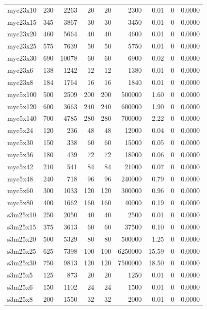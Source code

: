 {\begin{longtable}{lrrrrrrrr}
myc23x10 & 230 & 2263 & 20 & 20 & 2300 & 0.01 & 0 & 0.0000 \\
myc23x15 & 345 & 3867 & 30 & 30 & 3450 & 0.01 & 0 & 0.0000 \\
myc23x20 & 460 & 5664 & 40 & 40 & 4600 & 0.01 & 0 & 0.0000 \\
myc23x25 & 575 & 7639 & 50 & 50 & 5750 & 0.01 & 0 & 0.0000 \\
myc23x30 & 690 & 10078 & 60 & 60 & 6900 & 0.02 & 0 & 0.0000 \\
myc23x6 & 138 & 1242 & 12 & 12 & 1380 & 0.01 & 0 & 0.0000 \\
myc23x8 & 184 & 1764 & 16 & 16 & 1840 & 0.01 & 0 & 0.0000 \\
myc5x100 & 500 & 2509 & 200 & 200 & 500000 & 1.60 & 0 & 0.0000 \\
myc5x120 & 600 & 3663 & 240 & 240 & 600000 & 1.90 & 0 & 0.0000 \\
myc5x140 & 700 & 4785 & 280 & 280 & 700000 & 2.22 & 0 & 0.0000 \\
myc5x24 & 120 & 236 & 48 & 48 & 12000 & 0.04 & 0 & 0.0000 \\
myc5x30 & 150 & 338 & 60 & 60 & 15000 & 0.05 & 0 & 0.0000 \\
myc5x36 & 180 & 439 & 72 & 72 & 18000 & 0.06 & 0 & 0.0000 \\
myc5x42 & 210 & 541 & 84 & 84 & 21000 & 0.07 & 0 & 0.0000 \\
myc5x48 & 240 & 718 & 96 & 96 & 240000 & 0.79 & 0 & 0.0000 \\
myc5x60 & 300 & 1033 & 120 & 120 & 300000 & 0.96 & 0 & 0.0000 \\
myc5x80 & 400 & 1662 & 160 & 160 & 40000 & 0.19 & 0 & 0.0000 \\
s3m25x10 & 250 & 2050 & 40 & 40 & 2500 & 0.01 & 0 & 0.0000 \\
s3m25x15 & 375 & 3613 & 60 & 60 & 37500 & 0.10 & 0 & 0.0000 \\
s3m25x20 & 500 & 5329 & 80 & 80 & 500000 & 1.25 & 0 & 0.0000 \\
s3m25x25 & 625 & 7398 & 100 & 100 & 6250000 & 15.59 & 0 & 0.0000 \\
s3m25x30 & 750 & 9813 & 120 & 120 & 7500000 & 18.50 & 0 & 0.0000 \\
s3m25x5 & 125 & 873 & 20 & 20 & 1250 & 0.01 & 0 & 0.0000 \\
s3m25x6 & 150 & 1102 & 24 & 24 & 1500 & 0.01 & 0 & 0.0000 \\
s3m25x8 & 200 & 1550 & 32 & 32 & 2000 & 0.01 & 0 & 0.0000 \\
\end{longtable}}

